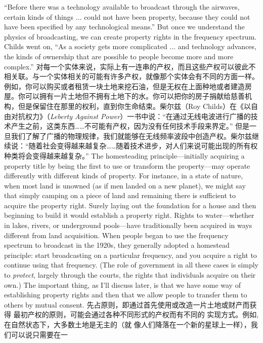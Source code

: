 \begin{paracol}{2}
``Before there was a technology available to broadcast through
the airwaves, certain kinds of things $\ldots$ could not have been
property, because they could not have been specified by any
technological means.'' But once we understand the physics of
broadcasting, we can create property rights in the frequency
spectrum. Childs went on, ``As a society gets more complicated $\ldots$ and technology advances, the kinds of ownership that are possible to people become more and more complex.''
\switchcolumn
对每一个实体来说，实际上有一连串的产权，而且这些产权可以彼此不相关联。与一个实体相关的可能有许多产权，就像那个实体会有不同的方面一样。例如，你可以购买或者租赁一块土地来挖石油，但是无权在上面种地或者建造房屋。你可以拥有一片土地但不拥有土地下的水。你可以把你的房子捐献给慈善机构，但是保留住在那里的权利，直到你生命结束。柴尔兹（Roy Childs）在《以自由对抗权力》（\textit{Leberty Against Power}）一书中说：“在通过无线电波进行广播的技术产生之前，这类东西……不可能有产权，因为没有任何技术手段来界定。” 但是一旦我们了解了广播的物理规律，我们就能够在无线频率波段中创造产权。柴尔兹继续说：“随着社会变得越来越复杂……随着技术进步，对人们来说可能出现的所有权种类将会变得越来越复杂。”
\switchcolumn*
The homesteading principle---initially acquiring a property
title by being the first to use or transform the property---may
operate differently with different kinds of property. For instance,
in a state of nature, when most land is unowned (as if men
landed on a new planet), we might say that simply camping on a
piece of land and remaining there is sufficient to acquire the
property right. Surely laying out the foundation for a house and
then beginning to build it would establish a property right.
Rights to water---whether in lakes, rivers, or underground
pools---have traditionally been acquired in ways different from
land acquisition. When people began to use the frequency spectrum to broadcast in the 1920s, they generally adopted a homestead principle: start broadcasting on a particular frequency, and
you acquire a right to continue using that frequency. (The role of
government in all these cases is simply to \textit{protect}, largely through
the courts, the rights that individuals acquire on their own.) The
important thing, as I'll discuss later, is that we have some way of
establishing property rights and then that we allow people to
transfer them to others by mutual consent.
\switchcolumn
先占原则，即通过首先使用或改造一片土地或财产而获得
最初产权的原则，可能会通过各种不同形式的产权而有不同的
实现方式。例如, 在自然状态下，大多数土地是无主的（就
像人们降落在一个新的星球上一样），我们可以说只需要在一

\end{paracol}

